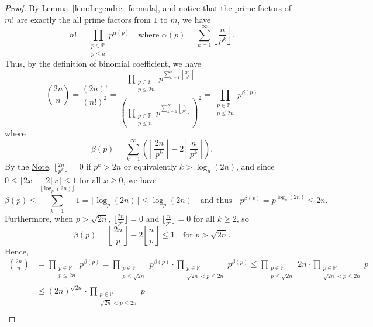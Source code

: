 \documentclass{elegantbook}
\begin{document}
\begin{proof}
  By Lemma~\ref{lem:Legendre_formula}, and notice that the prime factors of $m!$ are exactly the all prime factors from $1$ to $m$, we have
  \[
    n! = \prod_{\substack{p \in \mathbb{P} \\ p \leq n}} p^{\alpha(p)} \quad \text{where } \alpha(p) = \sum_{k=1}^{\infty} \left\lfloor \frac{n}{p^k} \right\rfloor.
  \]
  Thus, by the definition of binomial coefficient, we have
  \[
    \binom{2n}{n} = \frac{(2n)!}{(n!)^2} = \frac{\prod\limits_{\substack{p \in \mathbb{P} \\ p \leq 2n}} p^{\sum_{k=1}^{\infty} \left\lfloor \frac{2n}{p^k} \right\rfloor}}{\left(\prod\limits_{\substack{p \in \mathbb{P} \\ p \leq n}} p^{\sum_{k=1}^{\infty} \left\lfloor \frac{n}{p^k} \right\rfloor}\right)^2} = \prod_{\substack{p \in \mathbb{P} \\ p \leq 2n}} p^{\beta(p)}
  \]
  where
  \[
    \beta(p) = \sum_{k=1}^{\infty} \left( \left\lfloor \frac{2n}{p^k} \right\rfloor - 2 \left\lfloor \frac{n}{p^k} \right\rfloor \right).
  \]
  By the \hyperref[note:Legendre_formula_finite_sum]{Note}, $\lfloor \frac{2n}{p^k} \rfloor = 0$ if $p^k > 2n$ or equivalently $k > \log_p(2n)$, and since $0\leq \lfloor 2x \rfloor - 2\lfloor x \rfloor \leq 1$ for all $x \geq 0$, we have
  \[
    \beta(p) \leq \sum_{k=1}^{\lfloor \log_p(2n) \rfloor} 1 = \lfloor \log_p(2n) \rfloor \leq \log_p(2n) \quad \text{and thus} \quad p^{\beta(p)}=p^{\log_p(2n)} \leq 2n.
  \]
  Furthermore, when $p > \sqrt{2n}$, $\lfloor \frac{2n}{p^k} \rfloor = 0$ and $\lfloor \frac{n}{p^k} \rfloor = 0$ for all $k \geq 2$, so
  \[
    \beta(p) = \left\lfloor \frac{2n}{p} \right\rfloor - 2 \left\lfloor \frac{n}{p} \right\rfloor \leq 1 \quad \text{for } p > \sqrt{2n}.
  \]
  Hence,
  \begin{align*}
    \binom{2n}{n} &= \prod_{\substack{p \in \mathbb{P} \\ p \leq 2n}} p^{\beta(p)} = \prod_{\substack{p \in \mathbb{P} \\ p \leq \sqrt{2n}}} p^{\beta(p)} \cdot \prod_{\substack{p \in \mathbb{P} \\ \sqrt{2n} < p \leq 2n}} p^{\beta(p)} \leq \prod_{\substack{p \in \mathbb{P} \\ p \leq \sqrt{2n}}} 2n \cdot \prod_{\substack{p \in \mathbb{P} \\ \sqrt{2n} < p \leq 2n}} p \\
    &\leq (2n)^{\sqrt{2n}} \cdot \prod_{\substack{p \in \mathbb{P} \\ \sqrt{2n} < p \leq 2n}} p \\

\end{align*}
\end{proof}
\end{document}
